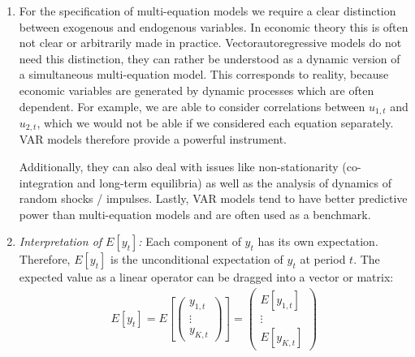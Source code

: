 \begin{enumerate}
\item For the specification of multi-equation models we require a clear distinction between exogenous and endogenous variables.
In economic theory this is often not clear or arbitrarily made in practice.
Vectorautoregressive models do not need this distinction,
  they can rather be understood as a dynamic version of a simultaneous multi-equation model.
This corresponds to reality, because economic variables are generated by dynamic processes which are often dependent.
For example, we are able to consider correlations between \(u_{1,t}\) and \(u_ {2,t}\),
  which we would not be able if we considered each equation separately.
VAR models therefore provide a powerful instrument.

Additionally, they can also deal with issues like non-stationarity (co-integration and long-term equilibria)
  as well as the analysis of dynamics of random shocks / impulses.
 Lastly, VAR models tend to have better predictive power than multi-equation models and are often used as a benchmark.

\item \emph{Interpretation of \(E[y_t]\):}
Each component of \(y_t\) has its own expectation.
Therefore, \(E[y_t]\) is the unconditional expectation of \(y_t\) at period \(t\).
The expected value as a linear operator can be dragged into a vector or matrix:
\begin{align*}
E[y_t] = E\left[ \begin{pmatrix} y_{1,t} \\ \vdots \\ y_{K,t} \end{pmatrix} \right]
= \begin{pmatrix} E[y_{1,t}] \\ \vdots \\ E[y_{K,t}] \end{pmatrix}
\end{align*}


\end{enumerate}
